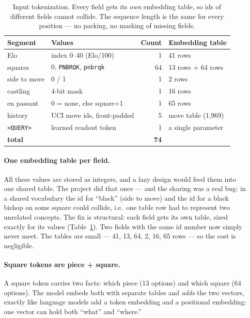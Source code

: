 \documentclass[10pt,a4paper]{article}
\newcommand{\code}[1]{\texttt{#1}}
\begin{document}
\begin{table}[htbp]
\centering
\small
\begin{tabular}{@{}llrl@{}}
\toprule
\textbf{Segment} & \textbf{Values} & \textbf{Count} & \textbf{Embedding table} \\
\midrule
Elo            & index 0--40 (Elo/100)          & 1  & 41 rows \\
squares        & 0, \code{PNBRQK}, \code{pnbrqk} & 64 & 13 rows + 64 rows \\
side to move   & 0 / 1                          & 1  & 2 rows \\
castling      & 4-bit mask                     & 1  & 16 rows \\
en passant     & 0 = none, else square+1        & 1  & 65 rows \\
history        & UCI move ids, front-padded     & 5  & move table (1{,}969) \\
\code{<QUERY>} & learned readout token          & 1  & a single parameter \\
\midrule
\textbf{total} &                                & \textbf{74} & \\
\bottomrule
\end{tabular}
\caption{Input tokenization. Every field gets its \emph{own} embedding
table, so ids of different fields cannot collide. The sequence length is
the same for every position --- no packing, no masking of missing fields.}
\label{tab:tokens}
\end{table}

\paragraph{One embedding table per field.} All these values are stored as
integers, and a lazy design would feed them into one shared table. The
project did that once --- and the sharing was a real bug: in a shared
vocabulary the id for ``black'' (side to move) and the id for a black
bishop on some square could collide, i.e.\ one table row had to represent
two unrelated concepts. The fix is structural: each field gets its own
table, sized exactly for its values (Table~\ref{tab:tokens}). Two fields
with the same id number now simply never meet. The tables are small ---
41, 13, 64, 2, 16, 65 rows --- so the cost is negligible.

\paragraph{Square tokens are piece + square.} A square token carries two
facts: which piece (13 options) and which square (64 options). The model
embeds both with separate tables and \emph{adds} the two vectors, exactly
like language models add a token embedding and a positional embedding:
one vector can hold both ``what'' and ``where.''
\end{document}
